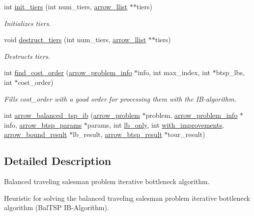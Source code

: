 \begin{CompactItemize}
int \hyperlink{lib_2baltsp_2baltsp-ib_8c_05a2ff158dd6edc613a6623787c04a31}{init\_\-tiers} (int num\_\-tiers, \hyperlink{structarrow__llist}{arrow\_\-llist} $\ast$$\ast$tiers)
\begin{CompactList}\small\item\em Initializes tiers. \item\end{CompactList}\item 
void \hyperlink{lib_2baltsp_2baltsp-ib_8c_086f8eb237774105f487040ef6ac62df}{destruct\_\-tiers} (int num\_\-tiers, \hyperlink{structarrow__llist}{arrow\_\-llist} $\ast$$\ast$tiers)
\begin{CompactList}\small\item\em Destructs tiers. \item\end{CompactList}\item 
int \hyperlink{lib_2baltsp_2baltsp-ib_8c_fe2b4359a26c49fe7602c86021b91ee7}{find\_\-cost\_\-order} (\hyperlink{structarrow__problem__info}{arrow\_\-problem\_\-info} $\ast$info, int max\_\-index, int $\ast$btsp\_\-lbs, int $\ast$cost\_\-order)
\begin{CompactList}\small\item\em Fills cost\_\-order with a good order for processing them with the IB-algorithm. \item\end{CompactList}\item 
int \hyperlink{lib_2baltsp_2baltsp-ib_8c_b416a4231c1efde53cc8191486a8db4d}{arrow\_\-balanced\_\-tsp\_\-ib} (\hyperlink{structarrow__problem}{arrow\_\-problem} $\ast$problem, \hyperlink{structarrow__problem__info}{arrow\_\-problem\_\-info} $\ast$info, \hyperlink{structarrow__btsp__params}{arrow\_\-btsp\_\-params} $\ast$params, int \hyperlink{bin_2baltsp-ib_8c_f328dea7847a1b1888dc14a570d0ec45}{lb\_\-only}, int \hyperlink{bin_2baltsp-ib2_8c_91079460b00ac08193d5ee47094f8f70}{with\_\-improvements}, \hyperlink{structarrow__bound__result}{arrow\_\-bound\_\-result} $\ast$lb\_\-result, \hyperlink{structarrow__btsp__result}{arrow\_\-btsp\_\-result} $\ast$tour\_\-result)
\end{CompactItemize}


\subsection{Detailed Description}
Balanced traveling salesman problem iterative bottleneck algorithm. 

Heuristic for solving the balanced traveling salesman problem iterative bottleneck algorithm (BalTSP IB-Algorithm).

